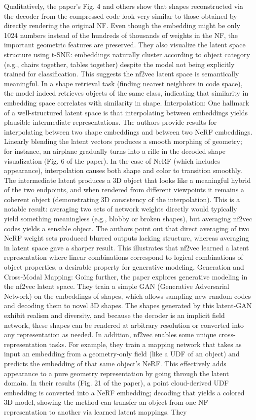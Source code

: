 \documentclass[11pt]{article}
\begin{document}
Qualitatively, the paper’s Fig. 4 and others show that shapes reconstructed via the decoder from the compressed code look very similar to those obtained by directly rendering the original NF. Even though the embedding might be only 1024 numbers instead of the hundreds of thousands of weights in the NF, the important geometric features are preserved. They also visualize the latent space structure using t-SNE: embeddings naturally cluster according to object category (e.g., chairs together, tables together) despite the model not being explicitly trained for classification. This suggests the nf2vec latent space is semantically meaningful. In a shape retrieval task (finding nearest neighbors in code space), the model indeed retrieves objects of the same class, indicating that similarity in embedding space correlates with similarity in shape. Interpolation: One hallmark of a well-structured latent space is that interpolating between embeddings yields plausible intermediate representations. The authors provide results for interpolating between two shape embeddings and between two NeRF embeddings. Linearly blending the latent vectors produces a smooth morphing of geometry; for instance, an airplane gradually turns into a rifle in the decoded shape visualization (Fig. 6 of the paper). In the case of NeRF (which includes appearance), interpolation causes both shape and color to transition smoothly. The intermediate latent produces a 3D object that looks like a meaningful hybrid of the two endpoints, and when rendered from different viewpoints it remains a coherent object (demonstrating 3D consistency of the interpolation). This is a notable result: averaging two sets of network weights directly would typically yield something meaningless (e.g., blobby or broken shapes), but averaging nf2vec codes yields a sensible object. The authors point out that direct averaging of two NeRF weight sets produced blurred outputs lacking structure, whereas averaging in latent space gave a sharper result. This illustrates that nf2vec learned a latent representation where linear combinations correspond to logical combinations of object properties, a desirable property for generative modeling. Generation and Cross-Modal Mapping: Going further, the paper explores generative modeling in the nf2vec latent space. They train a simple GAN (Generative Adversarial Network) on the embeddings of shapes, which allows sampling new random codes and decoding them to novel 3D shapes. The shapes generated by this latent-GAN exhibit realism and diversity, and because the decoder is an implicit field network, these shapes can be rendered at arbitrary resolution or converted into any representation as needed. In addition, nf2vec enables some unique cross-representation tasks. For example, they train a mapping network that takes as input an embedding from a geometry-only field (like a UDF of an object) and predicts the embedding of that same object’s NeRF. This effectively adds appearance to a pure geometry representation by going through the latent domain. In their results (Fig. 21 of the paper), a point cloud-derived UDF embedding is converted into a NeRF embedding; decoding that yields a colored 3D model, showing the method can transfer an object from one NF representation to another via learned latent mappings. They 
\end{document}
